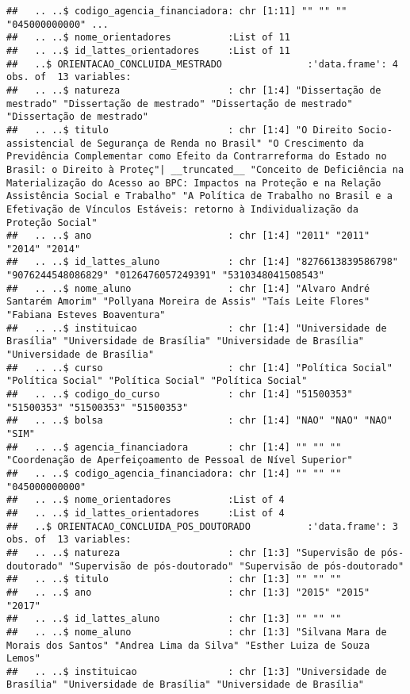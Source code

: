 \documentclass[]{article}
\begin{document}
\begin{verbatim}
##   .. ..$ codigo_agencia_financiadora: chr [1:11] "" "" "" "045000000000" ...
##   .. ..$ nome_orientadores          :List of 11
##   .. ..$ id_lattes_orientadores     :List of 11
##   ..$ ORIENTACAO_CONCLUIDA_MESTRADO               :'data.frame': 4 obs. of  13 variables:
##   .. ..$ natureza                   : chr [1:4] "Dissertação de mestrado" "Dissertação de mestrado" "Dissertação de mestrado" "Dissertação de mestrado"
##   .. ..$ titulo                     : chr [1:4] "O Direito Socio-assistencial de Segurança de Renda no Brasil" "O Crescimento da Previdência Complementar como Efeito da Contrarreforma do Estado no Brasil: o Direito à Proteç"| __truncated__ "Conceito de Deficiência na Materialização do Acesso ao BPC: Impactos na Proteção e na Relação Assistência Social e Trabalho" "A Política de Trabalho no Brasil e a Efetivação de Vínculos Estáveis: retorno à Individualização da Proteção Social"
##   .. ..$ ano                        : chr [1:4] "2011" "2011" "2014" "2014"
##   .. ..$ id_lattes_aluno            : chr [1:4] "8276613839586798" "9076244548086829" "0126476057249391" "5310348041508543"
##   .. ..$ nome_aluno                 : chr [1:4] "Alvaro André Santarém Amorim" "Pollyana Moreira de Assis" "Taís Leite Flores" "Fabiana Esteves Boaventura"
##   .. ..$ instituicao                : chr [1:4] "Universidade de Brasília" "Universidade de Brasília" "Universidade de Brasília" "Universidade de Brasília"
##   .. ..$ curso                      : chr [1:4] "Política Social" "Política Social" "Política Social" "Política Social"
##   .. ..$ codigo_do_curso            : chr [1:4] "51500353" "51500353" "51500353" "51500353"
##   .. ..$ bolsa                      : chr [1:4] "NAO" "NAO" "NAO" "SIM"
##   .. ..$ agencia_financiadora       : chr [1:4] "" "" "" "Coordenação de Aperfeiçoamento de Pessoal de Nível Superior"
##   .. ..$ codigo_agencia_financiadora: chr [1:4] "" "" "" "045000000000"
##   .. ..$ nome_orientadores          :List of 4
##   .. ..$ id_lattes_orientadores     :List of 4
##   ..$ ORIENTACAO_CONCLUIDA_POS_DOUTORADO          :'data.frame': 3 obs. of  13 variables:
##   .. ..$ natureza                   : chr [1:3] "Supervisão de pós-doutorado" "Supervisão de pós-doutorado" "Supervisão de pós-doutorado"
##   .. ..$ titulo                     : chr [1:3] "" "" ""
##   .. ..$ ano                        : chr [1:3] "2015" "2015" "2017"
##   .. ..$ id_lattes_aluno            : chr [1:3] "" "" ""
##   .. ..$ nome_aluno                 : chr [1:3] "Silvana Mara de Morais dos Santos" "Andrea Lima da Silva" "Esther Luiza de Souza Lemos"
##   .. ..$ instituicao                : chr [1:3] "Universidade de Brasília" "Universidade de Brasília" "Universidade de Brasília"

\end{verbatim}
\end{document}
